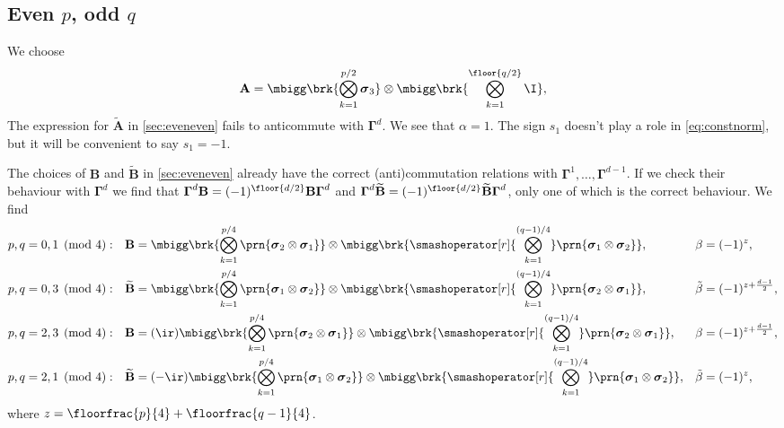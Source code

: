 \documentclass[11pt]{article}
\newcommand{\Gammab}{\boldsymbol{\Gamma}}
\newcommand{\A}{\mathbf{A}}
\newcommand{\B}{\mathbf{B}}
\newcommand{\At}{\widetilde{\A}}
\newcommand{\Bt}{\widetilde{\B}}
\newcommand{\sigmab}{\boldsymbol{\sigma}}
\newcommand{\betat}{\tilde{\beta}}
\begin{document}

\subsection{Even \texorpdfstring{$p$}{p}, odd \texorpdfstring{$q$}{q}}\label{sec:evenodd}

We choose
%
\begin{equation*}
  \A =  \mbigg\brk{\bigotimes_{k=1}^{{p/2}} \sigmab_3}
        \otimes \mbigg\brk{\bigotimes_{k=1}^{\floor{q/2}} \I},
\end{equation*}
%
The expression for $\At$ in \cref{sec:eveneven} fails to anticommute with $\Gammab^d$.
We see that $\alpha = 1$.
The sign $s_1$ doesn't play a role in \cref{eq:constnorm}, but it will be convenient to say $s_1 = -1$.

The choices of $\B$ and $\Bt$ in \cref{sec:eveneven} already have the correct (anti)commutation relations with $\Gammab^1, \ldots, \Gammab^{d-1}$.
If we check their behaviour with $\Gammab^d$ we find that $\Gammab^d \B = (-1)^{\floor{d/2}}\B \Gammab^d$ and $\Gammab^d \Bt = (-1)^{\floor{d/2}}\Bt \Gammab^d$, only one of which is the correct behaviour.
We find
%
\begin{equation*}
\begin{aligned}
  p,q &= 0,1 \pmod 4: &
  \B &= \mbigg\brk{\bigotimes_{k=1}^{p/4}
        \prn{\sigmab_2 \otimes \sigmab_1}} \otimes
        \mbigg\brk{\smashoperator[r]{\bigotimes_{k=1}^{(q-1)/4}}
        \prn{\sigmab_1 \otimes \sigmab_2}}, &
  \beta &= (-1)^{z}, \\
  p,q &= 0,3 \pmod 4: &
  \Bt &= \mbigg\brk{\bigotimes_{k=1}^{p/4}
        \prn{\sigmab_1 \otimes \sigmab_2}} \otimes
        \mbigg\brk{\smashoperator[r]{\bigotimes_{k=1}^{(q-1)/4}}
        \prn{\sigmab_2 \otimes \sigmab_1}}, &
  \betat &= (-1)^{z + \frac{d-1}{2}}, \\
  p,q &= 2,3 \pmod 4: &
  \B &= (\ir)
        \mbigg\brk{\bigotimes_{k=1}^{p/4}
        \prn{\sigmab_2 \otimes \sigmab_1}} \otimes
        \mbigg\brk{\smashoperator[r]{\bigotimes_{k=1}^{(q-1)/4}}
        \prn{\sigmab_2 \otimes \sigmab_1}}, &
  \beta &= (-1)^{z + \frac{d-1}{2}}, \\
  p,q &= 2,1 \pmod 4: &
  \Bt &= (-\ir)
        \mbigg\brk{\bigotimes_{k=1}^{p/4}
        \prn{\sigmab_1 \otimes \sigmab_2}} \otimes
        \mbigg\brk{\smashoperator[r]{\bigotimes_{k=1}^{(q-1)/4}}
        \prn{\sigmab_1 \otimes \sigmab_2}}, &
  \betat &= (-1)^{z}, 
\end{aligned}
\end{equation*}
%
where \( z = \floorfrac{p}{4} + \floorfrac{q-1}{4}\).
\end{document}
